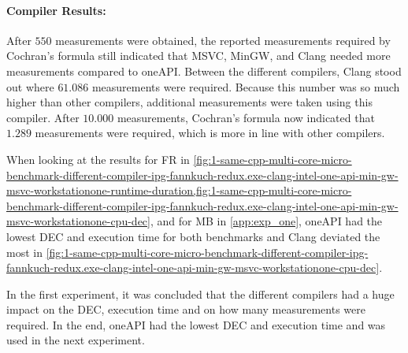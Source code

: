 
% 

\paragraph{Compiler Results:} After $550$ measurements were obtained, the reported measurements required by Cochran's formula still indicated that MSVC, MinGW, and Clang needed more measurements compared to oneAPI. Between the different compilers, Clang stood out where $61.086$ measurements were required. Because this number was so much higher than other compilers, additional measurements were taken using this compiler. After $10.000$ measurements, Cochran's formula now indicated that $1.289$ measurements were required, which is more in line with other compilers.


When looking at the results for FR in \cref{fig:1-same-cpp-multi-core-micro-benchmark-different-compiler-ipg-fannkuch-redux.exe-clang-intel-one-api-min-gw-msvc-workstationone-runtime-duration,fig:1-same-cpp-multi-core-micro-benchmark-different-compiler-ipg-fannkuch-redux.exe-clang-intel-one-api-min-gw-msvc-workstationone-cpu-dec}, and for MB in \cref{app:exp_one}, oneAPI had the lowest DEC and execution time for both benchmarks and Clang deviated the most in \cref{fig:1-same-cpp-multi-core-micro-benchmark-different-compiler-ipg-fannkuch-redux.exe-clang-intel-one-api-min-gw-msvc-workstationone-cpu-dec}.

In the first experiment, it was concluded that the different compilers had a huge impact on the DEC, execution time and on how many measurements were required. In the end, oneAPI had the lowest DEC and execution time and was used in the next experiment.

